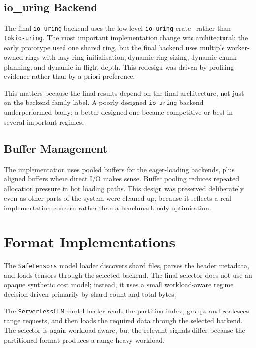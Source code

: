 \subsection{io\_uring Backend}

The final \texttt{io\_uring} backend uses the low-level \texttt{io-uring} crate~\cite{io_uring_crate} rather than \texttt{tokio-uring}. The most important implementation change was architectural: the early prototype used one shared ring, but the final backend uses multiple worker-owned rings with lazy ring initialisation, dynamic ring sizing, dynamic chunk planning, and dynamic in-flight depth. This redesign was driven by profiling evidence rather than by a priori preference.

This matters because the final results depend on the final architecture, not just on the backend family label. A poorly designed \texttt{io\_uring} backend underperformed badly; a better designed one became competitive or best in several important regimes.

\subsection{Buffer Management}

The implementation uses pooled buffers for the eager-loading backends, plus aligned buffers where direct I/O makes sense. Buffer pooling reduces repeated allocation pressure in hot loading paths. This design was preserved deliberately even as other parts of the system were cleaned up, because it reflects a real implementation concern rather than a benchmark-only optimisation.

\section{Format Implementations}

The \texttt{SafeTensors} model loader discovers shard files, parses the header metadata, and loads tensors through the selected backend. The final selector does not use an opaque synthetic cost model; instead, it uses a small workload-aware regime decision driven primarily by shard count and total bytes.

The \texttt{ServerlessLLM} model loader reads the partition index, groups and coalesces range requests, and then loads the required data through the selected backend. The selector is again workload-aware, but the relevant signals differ because the partitioned format produces a range-heavy workload.

